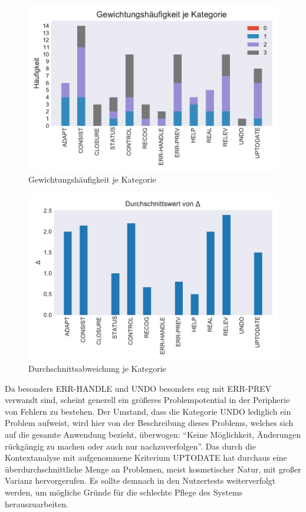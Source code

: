 \documentclass[
  12pt,
  ngerman,
  a4paper,
]{article}
\begin{document}
\newpage

\begin{figure}[t]
\includegraphics{src/images/stacked-bar.pdf}
\caption{Gewichtungshäufigkeit je Kategorie}
\label{fig:weight-per-category}
\end{figure}
\begin{figure}[b ]
\includegraphics{src/images/bar-dev.pdf}
\caption{Durchschnittsabweichung je Kategorie}
\label{fig:delta-per-category}
\end{figure}

\clearpage

Da besonders ERR-HANDLE und UNDO besonders eng mit ERR-PREV verwandt
sind, scheint generell ein größeres Problempotential in der Peripherie
von Fehlern zu bestehen. Der Umstand, dass die Kategorie UNDO lediglich
ein Problem aufweist, wird hier von der Beschreibung dieses Problems,
welches sich auf die gesamte Anwendung bezieht, überwogen: ``Keine
Möglichkeit, Änderungen rückgängig zu machen oder auch nur
nachzuverfolgen''. Das durch die Kontextanalyse mit aufgenommene
Kriterium UPTODATE hat durchaus eine überdurchschnittliche Menge an
Problemen, meist kosmetischer Natur, mit großer Varianz hervorgerufen.
Es sollte demnach in den Nutzertests weiterverfolgt werden, um mögliche
Gründe für die schlechte Pflege des Systems herauszuarbeiten.
\end{document}
